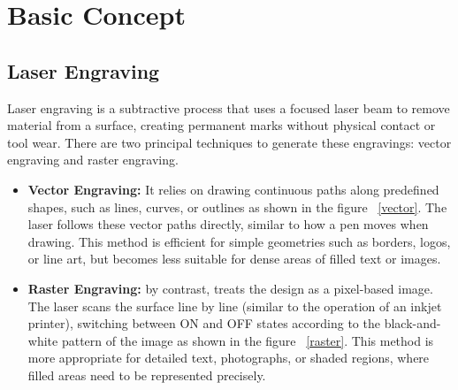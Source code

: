 \chapter{Basic Concept}
\setlength{\parskip}{1em} 

\section{Laser Engraving}
Laser engraving is a subtractive process that uses a focused laser beam to remove material from a surface, creating permanent marks without physical contact or tool wear. There are two principal techniques to generate these engravings: vector engraving and raster engraving. \cite{HaiTechLasers:MasterGuideLaserEngraving}

\begin{itemize}
	\item \textbf{Vector Engraving:} It relies on drawing continuous paths along predefined shapes, such as lines, curves, or outlines as shown in the figure ~\ref{vector}. The laser follows these vector paths directly, similar to how a pen moves when drawing. This method is efficient for simple geometries such as borders, logos, or line art, but becomes less suitable for dense areas of filled text or images. \cite{CNCSourced:RasterVsVectorEngravingGuide} \cite{xTool:RasterVsVectorEngraving}
	
	
	\item \textbf{Raster Engraving:} by contrast, treats the design as a pixel-based image. The laser scans the surface line by line (similar to the operation of an inkjet printer), switching between ON and OFF states according to the black-and-white pattern of the image as shown in the figure ~\ref{raster}. This method is more appropriate for detailed text, photographs, or shaded regions, where filled areas need to be represented precisely. \cite{CNCSourced:RasterVsVectorEngravingGuide} \cite{xTool:RasterVsVectorEngraving}
	
\end{itemize}

